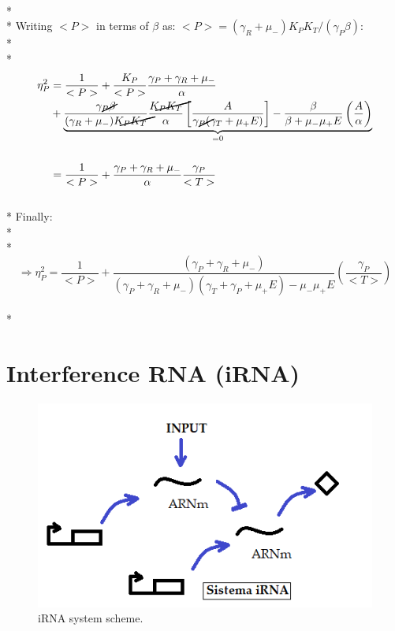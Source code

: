 \documentclass{article}
\begin{document}
\\*
\\*
Writing $<P>$ in terms of $\beta$ as: $<P> = (\gamma_R + \mu_-)K_PK_T/(\gamma_P\beta)$:
\\*
\\*
\begin{align*}
    \eta_P^2 &= \frac{1}{<P>} + \frac{K_P}{<P>}\frac{\gamma_P + \gamma_R + \mu_-}{\alpha}\\
             &+ \underbrace{\frac{\cancel{\gamma_P}\beta}{(\gamma_R + \mu_-)\cancel{K_PK_T}}\frac{\cancel{K_PK_T}}{\alpha}\left[\frac{A}{\cancel{\gamma_P}(\gamma_T + \mu_+E)}\right] - \frac{\beta}{\beta + \mu_-\mu_+E}\left(\frac{A}{\alpha}\right)}_{=0}\\
             \\
             &= \frac{1}{<P>} + \frac{\gamma_P + \gamma_R + \mu_-}{\alpha}\frac{\gamma_P}{<T>}
\end{align*}
\\*
Finally:
\\*
\\*
\begin{equation}
    \Longrightarrow  \boxed{\eta_P^2 = \frac{1}{<P>} + \frac{(\gamma_P + \gamma_R + \mu_-)}{(\gamma_P + \gamma_R + \mu_-)(\gamma_T + \gamma_P + \mu_+E) - \mu_-\mu_+E}\left(\frac{\gamma_P}{<T>}\right)}
\end{equation}
\\*
\newpage


\section{Interference RNA (iRNA)}

\begin{figure}[h!]
\centering
\includegraphics[scale=0.6]{iRNA}
\caption{iRNA system scheme.}
\label{fig:estructura}
\end{figure}
\end{document}
